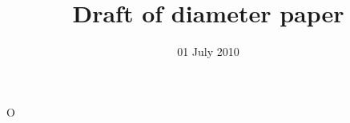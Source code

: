 \documentclass{umthesis}
\title{Draft of diameter paper}
\date{01 July 2010}
\begin{document}
O
\end{document}
